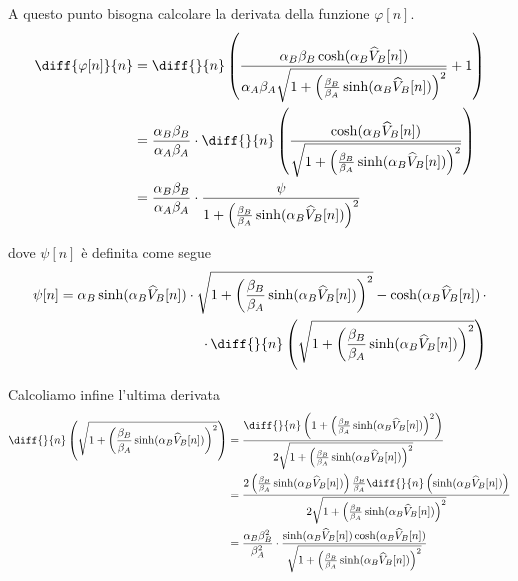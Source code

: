 		
		A questo punto bisogna calcolare la derivata della funzione $\varphi[n]$.
		\begin{equation}
			\begin{split}
				\diff{\varphi[n]}{n} &= \diff{}{n}\left(\frac{\alpha_{B}\beta_{B}\cosh(\alpha_{B}\widehat V_{B}[n])}{\alpha_{A}\beta_{A}\sqrt{1+\left(\frac{\beta_{B}}{\beta_{A}}\sinh(\alpha_{B}\widehat V_{B}[n])\right)^{2}}}+1\right)\\
				&= \frac{\alpha_{B}\beta_{B}}{\alpha_{A}\beta_{A}}\cdot\diff{}{n}\left(\frac{\cosh(\alpha_{B}\widehat V_{B}[n])}{\sqrt{1+\left(\frac{\beta_{B}}{\beta_{A}}\sinh(\alpha_{B}\widehat V_{B}[n])\right)^{2}}}\right)\\
				&= \frac{\alpha_{B}\beta_{B}}{\alpha_{A}\beta_{A}}\cdot\frac{\psi}{1+\left(\frac{\beta_{B}}{\beta_{A}}\sinh(\alpha_{B}\widehat V_{B}[n])\right)^{2}}
			\end{split}
		\end{equation}
		
		dove $\psi[n]$ è definita come segue
		\begin{equation}
			\begin{split}
				\psi[n] = \alpha_{B}\sinh(\alpha_{B}\widehat V_{B}[n])\cdot\sqrt{1+\left(\frac{\beta_{B}}{\beta_{A}}\sinh(\alpha_{B}\widehat V_{B}[n])\right)^{2}}-\cosh(\alpha_{B}\widehat V_{B}[n])\,\cdot\\
				\cdot\,\diff{}{n}\left(\sqrt{1+\left(\frac{\beta_{B}}{\beta_{A}}\sinh(\alpha_{B}\widehat V_{B}[n])\right)^{2}}\right)
			\end{split}
		\end{equation}
		\pagebreak
		
		Calcoliamo infine l'ultima derivata
		\vspace{-10px}
		\begin{equation}
			\begin{split}
				\diff{}{n}\left(\sqrt{1+\left(\frac{\beta_{B}}{\beta_{A}}\sinh(\alpha_{B}\widehat V_{B}[n])\right)^{2}}\right) &= \frac{\diff{}{n}\left(1+\left(\frac{\beta_{B}}{\beta_{A}}\sinh(\alpha_{B}\widehat V_{B}[n])\right)^{2}\right)}{2\sqrt{1+\left(\frac{\beta_{B}}{\beta_{A}}\sinh(\alpha_{B}\widehat V_{B}[n])\right)^{2}}}\\
				&= \frac{2\left(\frac{\beta_{B}}{\beta_{A}}\sinh(\alpha_{B}\widehat V_{B}[n])\right)\frac{\beta_{B}}{\beta_{A}}\diff{}{n}\left(\sinh(\alpha_{B}\widehat V_{B}[n])\right)}{2\sqrt{1+\left(\frac{\beta_{B}}{\beta_{A}}\sinh(\alpha_{B}\widehat V_{B}[n])\right)^{2}}}\\
				&= \frac{\alpha_{B}\beta_{B}^{2}}{\beta_{A}^{2}}\cdot\frac{\sinh(\alpha_{B}\widehat V_{B}[n])\cosh(\alpha_{B}\widehat V_{B}[n])}{\sqrt{1+\left(\frac{\beta_{B}}{\beta_{A}}\sinh(\alpha_{B}\widehat V_{B}[n])\right)^{2}}}
			\end{split}
		\end{equation}

